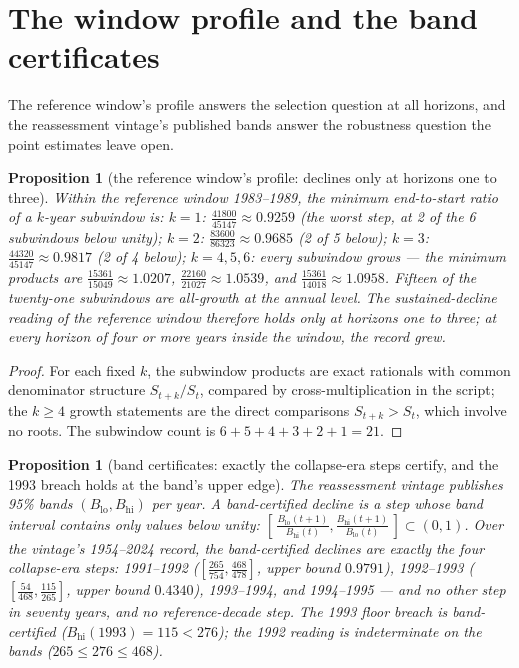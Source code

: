 \documentclass[10pt,twocolumn]{article}
\theoremstyle{plain}
\newtheorem{proposition}[theorem]{Proposition}
\theoremstyle{remark}
\begin{document}
\section{The window profile and the band certificates}\label{profile}

The reference window's profile answers the selection question at all
horizons, and the reassessment vintage's published bands answer the
robustness question the point estimates leave open.

\begin{proposition}[the reference window's profile: declines only at
horizons one to three]\label{prop:profile}
Within the reference window 1983--1989, the minimum end-to-start ratio
of a \(k\)-year subwindow is: \(k=1\):
\(\tfrac{41800}{45147} \approx 0.9259\) (the worst step, at 2 of the 6
subwindows below unity); \(k=2\): \(\tfrac{83600}{86323} \approx
0.9685\) (2 of 5 below); \(k=3\): \(\tfrac{44320}{45147} \approx
0.9817\) (2 of 4 below); \(k = 4, 5, 6\): every subwindow grows ---
the minimum products are \(\tfrac{15361}{15049} \approx 1.0207\),
\(\tfrac{22160}{21027} \approx 1.0539\), and
\(\tfrac{15361}{14018} \approx 1.0958\). Fifteen of the twenty-one
subwindows are all-growth at the annual level. The sustained-decline
reading of the reference window therefore holds only at horizons one
to three; at every horizon of four or more years inside the window,
the record grew.
\end{proposition}

\begin{proof}
For each fixed \(k\), the subwindow products are exact rationals with
common denominator structure \(S_{t+k}/S_t\), compared by
cross-multiplication in the script; the \(k \ge 4\) growth statements
are the direct comparisons \(S_{t+k} > S_t\), which involve no roots.
The subwindow count is \(6+5+4+3+2+1 = 21\).
\end{proof}

\begin{proposition}[band certificates: exactly the collapse-era steps
certify, and the 1993 breach holds at the band's upper edge]
\label{prop:bands}
The reassessment vintage publishes 95\% bands \((B_{\mathrm{lo}},
B_{\mathrm{hi}})\) per year. A band-certified decline is a step whose
band interval contains only values below unity:
\([\,\tfrac{B_{\mathrm{lo}}(t+1)}{B_{\mathrm{hi}}(t)},
\tfrac{B_{\mathrm{hi}}(t+1)}{B_{\mathrm{lo}}(t)}\,] \subset (0,1)\).
Over the vintage's 1954--2024 record, the band-certified declines are
exactly the four collapse-era steps: 1991--1992
(\([\tfrac{265}{754}, \tfrac{468}{478}]\), upper bound \(0.9791\)),
1992--1993 (\([\tfrac{54}{468}, \tfrac{115}{265}]\), upper bound
\(0.4340\)), 1993--1994, and 1994--1995 --- and no other step in
seventy years, and no reference-decade step. The 1993 floor breach is
band-certified (\(B_{\mathrm{hi}}(1993) = 115 < 276\)); the 1992
reading is indeterminate on the bands (\(265 \le 276 \le 468\)).
\end{proposition}
\end{document}
